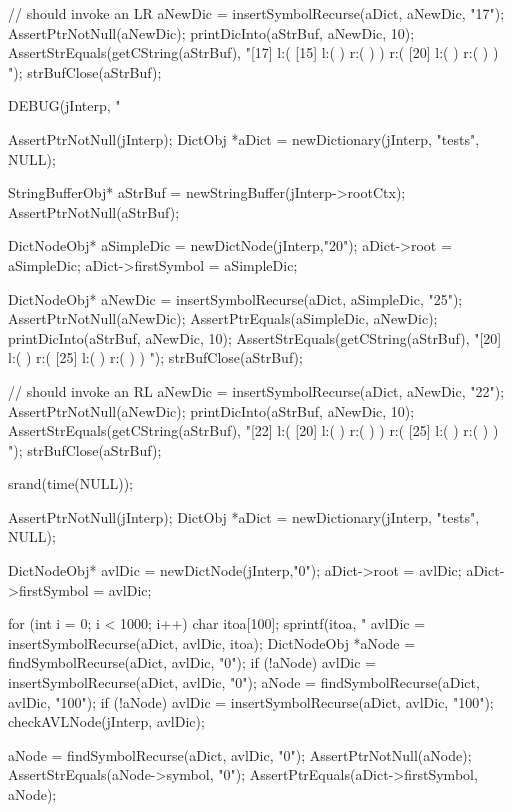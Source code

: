   // should invoke an LR
  aNewDic = insertSymbolRecurse(aDict, aNewDic, "17");
  AssertPtrNotNull(aNewDic);
  printDicInto(aStrBuf, aNewDic, 10);
  AssertStrEquals(getCString(aStrBuf),
  "[17] l:( [15] l:(  ) r:(  )  ) r:( [20] l:(  ) r:(  )  ) ");
  strBufClose(aStrBuf);
\stopCTest
\stopTestCase


\startCTest
  DEBUG(jInterp, "\n%

  AssertPtrNotNull(jInterp);
  DictObj *aDict = newDictionary(jInterp, "tests", NULL);

  StringBufferObj* aStrBuf = newStringBuffer(jInterp->rootCtx);
  AssertPtrNotNull(aStrBuf);
  
  DictNodeObj* aSimpleDic = newDictNode(jInterp,"20");
  aDict->root             = aSimpleDic;
  aDict->firstSymbol      = aSimpleDic;

  DictNodeObj* aNewDic = insertSymbolRecurse(aDict, aSimpleDic, "25");
  AssertPtrNotNull(aNewDic);
  AssertPtrEquals(aSimpleDic, aNewDic);
  printDicInto(aStrBuf, aNewDic, 10);
  AssertStrEquals(getCString(aStrBuf),
  "[20] l:(  ) r:( [25] l:(  ) r:(  )  ) ");
  strBufClose(aStrBuf);
  
  // should invoke an RL
  aNewDic = insertSymbolRecurse(aDict, aNewDic, "22");
  AssertPtrNotNull(aNewDic);
  printDicInto(aStrBuf, aNewDic, 10);
  AssertStrEquals(getCString(aStrBuf),
  "[22] l:( [20] l:(  ) r:(  )  ) r:( [25] l:(  ) r:(  )  ) ");
  strBufClose(aStrBuf);
\stopCTest
\stopTestCase

\startCTest

  srand(time(NULL));

  AssertPtrNotNull(jInterp);
  DictObj *aDict = newDictionary(jInterp, "tests", NULL);

  DictNodeObj* avlDic = newDictNode(jInterp,"0");
  aDict->root         = avlDic;
  aDict->firstSymbol  = avlDic;

  for (int i = 0; i < 1000; i++) {
    char itoa[100];
    sprintf(itoa, "%
    avlDic = insertSymbolRecurse(aDict, avlDic, itoa);
  }
  DictNodeObj *aNode = findSymbolRecurse(aDict, avlDic, "0");
  if (!aNode) avlDic = insertSymbolRecurse(aDict, avlDic, "0");
  aNode = findSymbolRecurse(aDict, avlDic, "100");
  if (!aNode) avlDic = insertSymbolRecurse(aDict, avlDic, "100");
  checkAVLNode(jInterp, avlDic);

  aNode = findSymbolRecurse(aDict, avlDic, "0");
  AssertPtrNotNull(aNode);
  AssertStrEquals(aNode->symbol, "0");
  AssertPtrEquals(aDict->firstSymbol, aNode);
  
